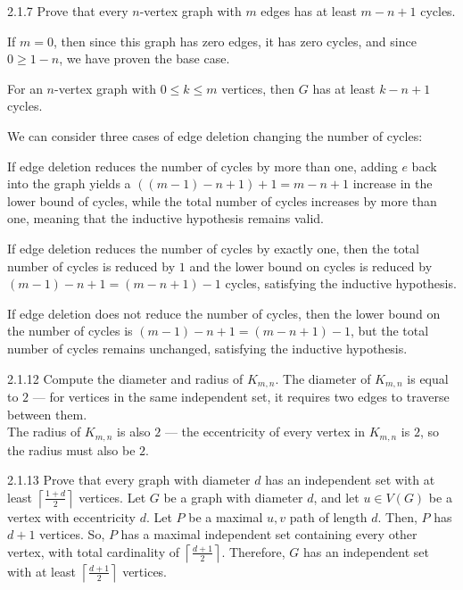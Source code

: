\documentclass[10pt]{extarticle}
\begin{document}
  \begin{problem}{2.1.7}
    Prove that every $n$-vertex graph with $m$ edges has at least $m-n+1$ cycles.
    \tcblower
    \begin{description}[font=\normalfont\scshape]
      \item[Base Case] If $m = 0$, then since this graph has zero edges, it has zero cycles, and since $0\geq 1-n$, we have proven the base case.
      \item[Inductive Hypothesis] For an $n$-vertex graph with $0\leq k\leq m$ vertices, then $G$ has at least $k-n+1$ cycles.
      \item[Proof] We can consider three cases of edge deletion changing the number of cycles:
        \begin{description}[font=\normalfont\scshape]
          \item[Reduction of $>1$ cycle] If edge deletion reduces the number of cycles by more than one, adding $e$ back into the graph yields a $((m-1)-n+1) + 1 = m-n+1$ increase in the lower bound of cycles, while the total number of cycles increases by more than one, meaning that the inductive hypothesis remains valid.
          \item[Reduction of exactly $1$ cycle] If edge deletion reduces the number of cycles by exactly one, then the total number of cycles is reduced by $1$ and the lower bound on cycles is reduced by $(m-1) - n + 1 = (m-n+1)-1$ cycles, satisfying the inductive hypothesis.
          \item[Reduction of $0$ cycles] If edge deletion does not reduce the number of cycles, then the lower bound on the number of cycles is $(m-1) - n + 1 = (m-n+1)-1$, but the total number of cycles remains unchanged, satisfying the inductive hypothesis.
        \end{description}
    \end{description}
  \end{problem}
  \begin{problem}{2.1.12}
    Compute the diameter and radius of $K_{m,n}$.
    \tcblower
    The diameter of $K_{m,n}$ is equal to $2$ --- for vertices in the same independent set, it requires two edges to traverse between them.\\

    The radius of $K_{m,n}$ is also $2$ --- the eccentricity of every vertex in $K_{m,n}$ is $2$, so the radius must also be $2$.
  \end{problem}
  \begin{problem}{2.1.13}
    Prove that every graph with diameter $d$ has an independent set with at least $\left\lceil\frac{1+d}{2}\right\rceil$ vertices.
    \tcblower
    Let $G$ be a graph with diameter $d$, and let $u\in V(G)$ be a vertex with eccentricity $d$. Let $P$ be a maximal $u,v$ path of length $d$. Then, $P$ has $d+1$ vertices. So, $P$ has a maximal independent set containing every other vertex, with total cardinality of $\left\lceil \frac{d+1}{2} \right\rceil$. Therefore, $G$ has an independent set with at least $\left\lceil\frac{d+1}{2}\right\rceil$ vertices.
  \end{problem}
\end{document}
